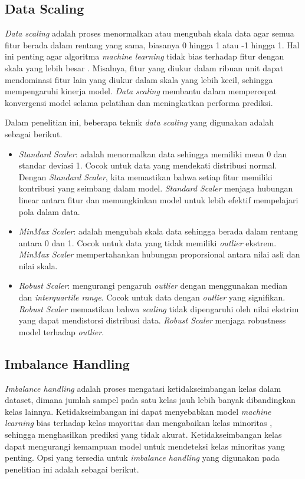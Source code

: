 \documentclass[conference]{IEEEtran}
\begin{document}
\subsection{Data Scaling}
\textit{Data scaling} adalah proses menormalkan atau mengubah skala data agar semua fitur berada dalam rentang yang sama, biasanya 0 hingga 1 atau -1 hingga 1. Hal ini penting agar algoritma \textit{machine learning} tidak bias 
terhadap fitur dengan skala yang lebih besar \cite{b37}. Misalnya, fitur yang diukur dalam ribuan unit dapat mendominasi fitur lain yang diukur dalam skala yang lebih kecil, sehingga mempengaruhi kinerja model. 
\textit{Data scaling} membantu dalam mempercepat konvergensi model selama pelatihan dan meningkatkan performa prediksi.

Dalam penelitian ini, beberapa teknik \textit{data scaling} yang digunakan adalah sebagai berikut.

\begin{itemize}
    \item \textit{Standard Scaler}: adalah menormalkan data sehingga memiliki mean 0 dan standar deviasi 1. Cocok untuk data yang mendekati distribusi normal. 
    Dengan \textit{Standard Scaler}, kita memastikan bahwa setiap fitur memiliki kontribusi yang seimbang dalam model. \textit{Standard Scaler} menjaga hubungan linear antara fitur 
    dan memungkinkan model untuk lebih efektif mempelajari pola dalam data.
    \item \textit{MinMax Scaler}: adalah mengubah skala data sehingga berada dalam rentang antara 0 dan 1. Cocok untuk data yang tidak memiliki \textit{outlier} ekstrem. 
    \textit{MinMax Scaler} mempertahankan hubungan proporsional antara nilai asli dan nilai skala.
    \item \textit{Robust Scaler}: mengurangi pengaruh \textit{outlier} dengan menggunakan median dan \textit{interquartile range}. 
    Cocok untuk data dengan \textit{outlier} yang signifikan. \textit{Robust Scaler} memastikan bahwa \textit{scaling} tidak dipengaruhi oleh nilai ekstrim 
    yang dapat mendistorsi distribusi data. \textit{Robust Scaler} menjaga robustness model terhadap \textit{outlier}.
\end{itemize}

\subsection{Imbalance Handling}

\textit{Imbalance handling} adalah proses mengatasi ketidakseimbangan kelas dalam dataset, dimana jumlah sampel pada satu kelas jauh lebih banyak 
dibandingkan kelas lainnya. Ketidakseimbangan ini dapat menyebabkan model \textit{machine learning} bias terhadap kelas mayoritas dan mengabaikan kelas minoritas \cite{b38}, 
sehingga menghasilkan prediksi yang tidak akurat. Ketidakseimbangan kelas dapat mengurangi kemampuan model untuk mendeteksi kelas minoritas yang penting. Opsi yang tersedia untuk 
\textit{imbalance handling} yang digunakan pada penelitian ini adalah sebagai berikut.
\end{document}
